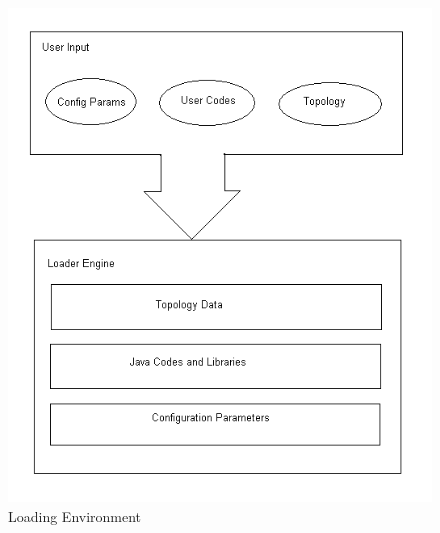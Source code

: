 \begin{figure}[ht!]
\includegraphics[width=1.0\textwidth,keepaspectratio]{./figure42}
\caption{Loading Environment}
\label{pic:fig42}
\end{figure}

